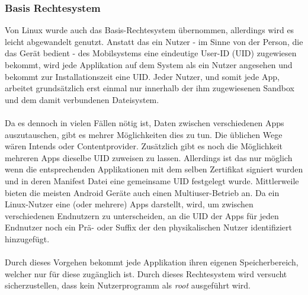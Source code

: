 	\subsubsection{Basis Rechtesystem}\label{sec:BasisRechteSystem}
	Von Linux wurde auch das Basis-Rechtesystem übernommen, allerdings wird es leicht abgewandelt genutzt. Anstatt das ein Nutzer - im Sinne von der Person, die das Gerät bedient - des Mobilsystems eine eindeutige User-ID (UID) zugewiesen bekommt, wird jede Applikation auf dem System als ein Nutzer angesehen und bekommt zur Installationszeit eine UID. Jeder Nutzer, und somit jede App, arbeitet grundsätzlich erst einmal nur innerhalb der ihm zugewiesenen Sandbox und dem damit verbundenen Dateisystem.\\\\
	Da es dennoch in vielen Fällen nötig ist, Daten zwischen verschiedenen Apps auszutauschen, gibt es mehrer Möglichkeiten dies zu tun. Die üblichen Wege wären Intends oder Contentprovider. Zusätzlich gibt es noch die Möglichkeit mehreren Apps dieselbe UID zuweisen zu lassen. Allerdings ist das nur möglich wenn die entsprechenden Applikationen mit dem selben Zertifikat signiert wurden und in deren Manifest Datei eine gemeinsame UID festgelegt wurde.
	Mittlerweile bieten die meisten Android Geräte auch einen Multiuser-Betrieb an. Da ein Linux-Nutzer eine (oder mehrere) Apps darstellt, wird, um zwischen verschiedenen Endnutzern zu unterscheiden, an die UID der Apps für jeden Endnutzer noch ein Prä- oder Suffix der den physikalischen Nutzer identifiziert hinzugefügt.\\\\
	Durch dieses Vorgehen bekommt jede Applikation ihren eigenen Speicherbereich, welcher nur für diese zugänglich ist. Durch dieses Rechtesystem wird versucht sicherzustellen, dass kein Nutzerprogramm als \textit{root} ausgeführt wird\cite[Kapitel Android's Security Model  - Application Sandboxing]{Drake2014}.
	
